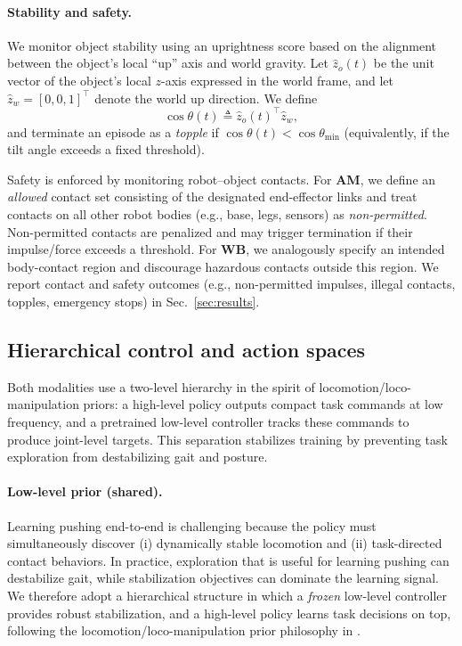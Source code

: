 \paragraph{Stability and safety.}
We monitor object stability using an uprightness score based on the alignment between the object’s local ``up'' axis and world gravity.
Let $\hat z_o(t)$ be the unit vector of the object’s local $z$-axis expressed in the world frame, and let $\hat z_w=[0,0,1]^\top$ denote the world up direction.
We define
\[
\cos\theta(t) \triangleq \hat z_o(t)^\top \hat z_w,
\]
and terminate an episode as a \emph{topple} if $\cos\theta(t) < \cos\theta_{\min}$ (equivalently, if the tilt angle exceeds a fixed threshold).

Safety is enforced by monitoring robot--object contacts. For \textbf{AM}, we define an \emph{allowed} contact set consisting of the designated end-effector links
and treat contacts on all other robot bodies (e.g., base, legs, sensors) as \emph{non-permitted}. Non-permitted contacts are penalized and may trigger termination
if their impulse/force exceeds a threshold. For \textbf{WB}, we analogously specify an intended body-contact region and discourage hazardous contacts outside this region.
We report contact and safety outcomes (e.g., non-permitted impulses, illegal contacts, topples, emergency stops) in Sec.~\ref{sec:results}.

\subsection{Hierarchical control and action spaces}
\label{sec:control}
Both modalities use a two-level hierarchy in the spirit of locomotion/loco-manipulation priors:
a high-level policy outputs compact task commands at low frequency, and a pretrained low-level controller tracks these commands to produce joint-level targets.
This separation stabilizes training by preventing task exploration from destabilizing gait and posture.

\paragraph{Low-level prior (shared).}
Learning pushing end-to-end is challenging because the policy must simultaneously discover (i) dynamically stable locomotion and (ii) task-directed contact behaviors.
In practice, exploration that is useful for learning pushing can destabilize gait, while stabilization objectives can dominate the learning signal.
We therefore adopt a hierarchical structure in which a \emph{frozen} low-level controller provides robust stabilization, and a high-level policy learns task decisions on top,
following the locomotion/loco-manipulation prior philosophy in \cite{Kumar2021RMA,2025relic}.

